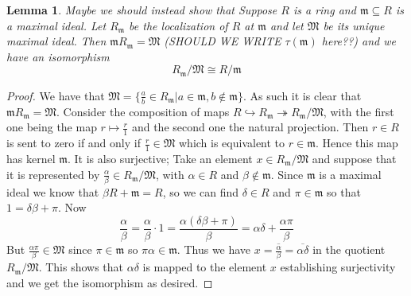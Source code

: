 \documentclass{article}
\newtheorem{lemma}{Lemma}[section]
\newcommand{\mfrak}[1]{\mathfrak{#1}}
\begin{document}
\begin{lemma} \label{lem: Localization isomorphism}
    Maybe we should instead show that 
    Suppose $R$ is a ring and $\mfrak m \subseteq R$ is a maximal ideal. Let $R_\mfrak m$ be the localization of $R$ at $\mfrak m$ and let $\mfrak M$ be its unique maximal ideal. Then $\mfrak m R_\mfrak m = \mfrak M$ (SHOULD WE WRITE $\tau(\mfrak m)$ here??) and we have an isomorphism
    $$R_\mfrak m / \mfrak M \cong R / \mfrak m$$ 
\end{lemma}
\begin{proof}
    We have that $\mfrak M = \{\frac{a}{b} \in R_\mfrak m | a \in \mfrak m, b \notin \mfrak m \}$. As such it is clear that $\mfrak m R_\mfrak m = \mfrak M$. Consider the composition of maps $R \hookrightarrow R_\mfrak m \twoheadrightarrow R_\mfrak m / \mfrak M$, with the first one being the map $r \mapsto \frac{r}{1}$ and the second one the natural projection. Then $r \in R$ is sent to zero if and only if $\frac{r}{1} \in \mfrak M$ which is equivalent to $r \in \mfrak m$. Hence this map has kernel $\mfrak m$. It is also surjective; Take an element $x \in R_\mfrak m / \mfrak M$ and suppose that it is represented by $\frac{\alpha}{\beta} \in R_\mfrak m / \mfrak M$, with $\alpha \in R$ and $\beta \notin \mfrak m$. Since $\mfrak m$ is a maximal ideal we know that $\beta R + \mfrak m = R$, so we can find $\delta \in R$ and $\pi \in \mfrak m$ so that $1 = \delta \beta + \pi$. Now 
    $$\frac{\alpha}{\beta} = \frac{\alpha}{\beta} \cdot 1 = \frac{\alpha (\delta \beta + \pi )}{\beta} = \alpha \delta + \frac{\alpha \pi}{\beta}$$
    But $\frac{\alpha \pi}{\beta} \in \mfrak M$ since $\pi \in \mfrak m$ so $\pi \alpha \in \mfrak m$. Thus we have $x = \overline {\frac{\alpha}{\beta}} = \overline {\alpha \delta}$ in the quotient $R_\mfrak m / \mfrak M$. This shows that $\alpha \delta$ is mapped to the element $x$ establishing surjectivity and we get the isomorphism as desired. 
\end{proof}
\end{document}
